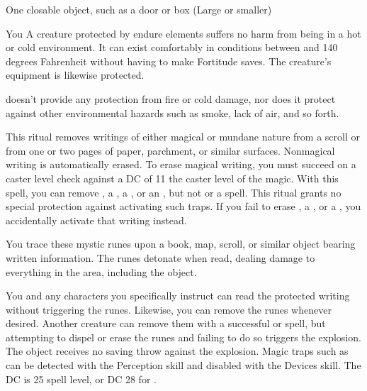 \begin{spelltarget}{One closable object, such as a door or box (Large or smaller)}
\begin{spelltarget}{You}
\spelldur{\durext}
\spelleffect A creature protected by endure elements suffers no harm from being in a hot or cold environment. It can exist comfortably in conditions between  and 140 degrees Fahrenheit without having to make Fortitude saves. The creature's equipment is likewise protected.
\spellnotes \par {} doesn't provide any protection from fire or cold damage, nor does it protect against other environmental hazards such as smoke, lack of air, and so forth.

\spelleffect This ritual removes writings of either magical or mundane nature from a scroll or from one or two pages of paper, parchment, or similar surfaces. Nonmagical writing is automatically erased. To erase magical writing, you must succeed on a caster level check against a DC of 11 \add the caster level of the magic. 
\spellnotes With this spell, you can remove , a , a , or an , but not  or a  spell. This ritual grants no special protection against activating such traps. If you fail to erase , a , or a , you accidentally activate that writing instead.

\spelleffect You trace these mystic runes upon a book, map, scroll, or similar object bearing written information. The runes detonate when read, dealing damage to everything in the area, including the object.
\par You and any characters you specifically instruct can read the protected writing without triggering the runes. Likewise, you can remove the runes whenever desired. Another creature can remove them with a successful  or  spell, but attempting to dispel or erase the runes and failing to do so triggers the explosion.
\spellnotes The object receives no saving throw against the explosion. Magic traps such as  can be detected with the Perception skill and disabled with the Devices skill. The DC is 25 \add spell level, or DC 28 for .


\end{spelltarget}
\end{spelltarget}

